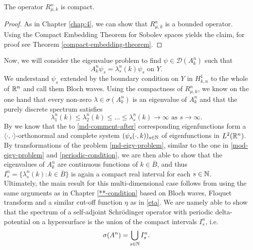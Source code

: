 \begin{theorem}
	The operator $R_{\mu, k}^{n}$ is compact.	

	\begin{proof}
		As in Chapter \ref{chap:4}, we can show that $R_{\mu, k}^{n}$ is a bounded operator. Using the Compact Embedding Theorem for Sobolev spaces yields the claim, for proof see Theorem \ref{compact-embedding-theorem}.
	\end{proof}
\end{theorem}

Now, we will consider the eigenvalue problem to find $\psi \in \mathcal{D}(A^{n}_{k})$ such that
	\begin{equation}
		A^{n}_{k} \psi_{s} = \lambda^{n}_{s}(k) \psi_{s} \text{ on } Y. \label{md-eigv-problem}
	\end{equation}
We understand $\psi_{s}$ extended by the boundary condition on $Y$ in $H^{1}_{k, n}$ to the whole of $\mathbb{R}^{n}$ and call them Bloch waves. Using the compactness of $R_{\mu, k}^{n}$, we know on the one hand that every non-zero $\lambda \in \sigma(A_{k}^{n})$ is an eigenvalue of $A_{k}^{n}$ and that the purely discrete spectrum satisfies
	\begin{equation}
		\lambda^{n}_{1}(k) \leq \lambda^{n}_{2}(k) \leq \dotsc \leq \lambda^{n}_{s}(k) \rightarrow \infty \text{ as } s \rightarrow \infty. \label{md-comment-after}
	\end{equation}
By \cite[page 643 - 645]{evans1998partial} we know that the to \eqref{md-comment-after} corresponding eigenfunctions form a $\langle \cdot , \cdot \rangle$-orthonormal and complete system $(\psi_{s}(\cdot, k))_{s \in \mathbb{N}}$ of eigenfunctions in $L^{2}(\mathbb{R}^{n})$. By transformations of the problem \eqref{md-eigv-problem}, similar to the one in \eqref{mod-eigv-problem} and \eqref{periodic-condition}, we are then able to show that the eigenvalues of $A^{n}_{k}$ are continuous functions of $k \in \overline{B}$, and thus $I^{n}_{s} = \{ \lambda^{n}_{s}(k) : k \in \overline{B} \}$ is again a compact real interval for each $s \in \mathbb{N}$.
~\\ 

Ultimately, the main result for this multi-dimensional case follows from using the same arguments as in Chapter \ref{**-condition} based on Bloch waves, Floquet transform and a similar cut-off function $\eta$ as in \eqref{eta}. We are namely able to show that the spectrum of a self-adjoint Schrödinger operator with periodic delta-potential on a hypersurface is the union of the compact intervals $I^{n}_{s}$, i.e.
	\[ \sigma(A^{n}) = \bigcup_{s \in \mathbb{N}} I^{n}_{s}. \]